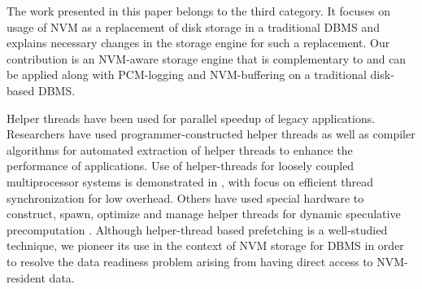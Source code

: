 The work presented in this paper belongs to the third category. It focuses on usage of NVM as a replacement of disk storage in a traditional DBMS and explains necessary changes in the storage engine for such a replacement. Our contribution is an NVM-aware storage engine that is complementary to and can be applied along with PCM-logging \cite{gao2011pcmlogging} and NVM-buffering \cite{son2017log} on a traditional disk-based DBMS.





Helper threads have been used for parallel speedup of legacy applications.  Researchers have used programmer-constructed helper threads \cite{kamruzzaman2011inter} as well as compiler algorithms \cite{kim2002design} for automated extraction of helper threads to enhance the performance of applications. Use of helper-threads for loosely coupled multiprocessor systems is demonstrated in \cite{jung2006helper}, with focus on efficient thread synchronization for low overhead. Others have used special hardware to construct, spawn, optimize and manage helper threads for dynamic speculative precomputation \cite{collins2001dynamic}. Although helper-thread based prefetching is a well-studied technique, we pioneer its use in the context of NVM storage for DBMS in order to resolve the data readiness problem arising from having direct access to NVM-resident data.